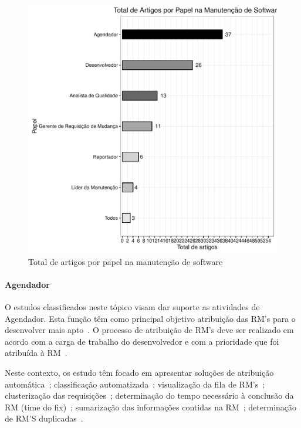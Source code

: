 \begin{figure}[htpb]
	\centering
	\includegraphics[width=0.8\linewidth]{chapter-mapeamento-sistematico/img/grafico_papel_por_artigo.pdf}
	\caption{Total de artigos por papel na manutenção de software}\label{fig:graf_papel_por_artigo}
\end{figure}

\paragraph{Agendador}
O estudos classificados neste tópico visam dar suporte as atividades de
Agendador. Esta função têm como principal objetivo atribuição das RM’s
para o desenvolver mais apto~\cite{banitaan2013decoba}. O processo de atribuição
de RM's deve ser realizado em acordo com a carga de trabalho do desenvolvedor e
com a prioridade que foi atribuída à RM~\cite{chawla2015automated}. 

Neste contexto, os estudo têm focado em apresentar soluções de atribuição
automática~\cite{banitaan2013decoba, shokripour2012automatic,
	somasundaram2012automatici,Naguib2013, Zhang2014, Zanetti2013}; classificação
automatizada~\cite{gegick2010identifying,liu2014faceted, behl2014bug,
	chawla2015automated,tian2015automated}; visualização da
fila de RM's~\cite{izquierdo2015gila}; clusterização das
requisições~\cite{liu2014faceted}; determinação do tempo necessário à conclusão
da RM (time do fix)~\cite{hosseini2012market,
	Bhattacharya:2011:BTP:1985441.1985472}; sumarização das informações
contidas na RM~\cite{mani2012ausum}; determinação de RM'S
duplicadas~\cite{Sun2011, Wu2011a}.

